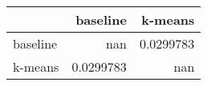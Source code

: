 \begin{tabular}{lrr}
\toprule
          &    baseline &     k-means \\
\midrule
 baseline & nan         &   0.0299783 \\
 k-means  &   0.0299783 & nan         \\
\bottomrule
\end{tabular}